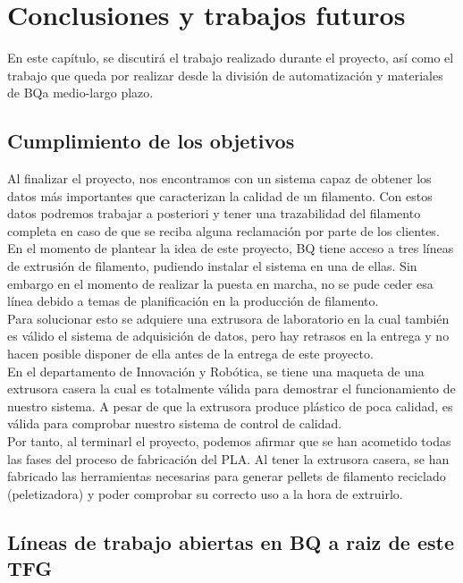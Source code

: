 \chapter{Conclusiones y trabajos futuros}
\label{cap:conclus}

En este capítulo, se discutirá el trabajo realizado durante el proyecto, así como el trabajo que queda por realizar desde la división de automatización y materiales de BQa medio-largo plazo.

\section{Cumplimiento de los objetivos}

Al finalizar el proyecto, nos encontramos con un sistema capaz de obtener los datos más importantes que caracterizan la calidad de un filamento. Con estos datos podremos trabajar a posteriori y tener una trazabilidad del filamento completa en caso de que se reciba alguna reclamación por parte de los clientes.\\

En el momento de plantear la idea de este proyecto, BQ tiene acceso a tres líneas de extrusión de filamento,  pudiendo instalar el sistema en una de ellas. Sin embargo en el momento de realizar la puesta en marcha, no se pude ceder esa línea debido a temas de planificación en la producción de filamento.\\

Para solucionar esto se adquiere una extrusora de laboratorio en la cual también es válido el sistema de adquisición de datos, pero hay retrasos en la entrega y no hacen posible disponer de ella antes de la entrega de este proyecto.\\

En el departamento de Innovación y Robótica, se tiene una maqueta de una extrusora casera la cual es totalmente válida para demostrar el funcionamiento de nuestro sistema. A pesar de que la extrusora produce plástico de poca calidad, es válida para comprobar nuestro sistema de control de calidad.\\

Por tanto, al terminarl el proyecto, podemos afirmar que se han acometido todas las fases del proceso de fabricación del PLA. Al tener la extrusora casera, se han fabricado las herramientas necesarias para generar pellets de filamento reciclado (peletizadora) y poder comprobar su correcto uso a la hora de extruirlo.

\section{Líneas de trabajo abiertas en BQ a raiz de este TFG}

